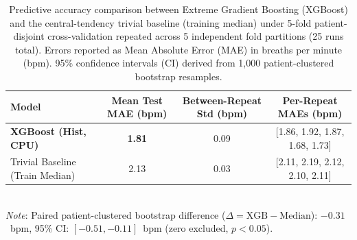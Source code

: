 
\begin{table}[htbp]
\centering
\caption{Predictive accuracy comparison between Extreme Gradient Boosting (XGBoost) and the central-tendency trivial baseline (training median) under 5-fold patient-disjoint cross-validation repeated across 5 independent fold partitions (25 runs total). Errors reported as Mean Absolute Error (MAE) in breaths per minute (bpm). 95\% confidence intervals (CI) derived from 1,000 patient-clustered bootstrap resamples.}
\label{tab:predictive_accuracy}
\begin{tabular}{lccc}
\toprule
\textbf{Model} & \textbf{Mean Test MAE (bpm)} & \textbf{Between-Repeat Std (bpm)} & \textbf{Per-Repeat MAEs (bpm)} \\
\midrule
\textbf{XGBoost (Hist, CPU)} & \textbf{1.81} & 0.09 & [1.86, 1.92, 1.87, 1.68, 1.73] \\
Trivial Baseline (Train Median) & 2.13 & 0.03 & [2.11, 2.19, 2.12, 2.10, 2.11] \\
\bottomrule
\end{tabular}
\vspace{1mm}\\
\footnotesize{\textit{Note}: Paired patient-clustered bootstrap difference ($\Delta = \text{XGB} - \text{Median}$): $-0.31$~bpm, 95\% CI: $[-0.51, -0.11]$~bpm (zero excluded, $p < 0.05$).}
\end{table}


